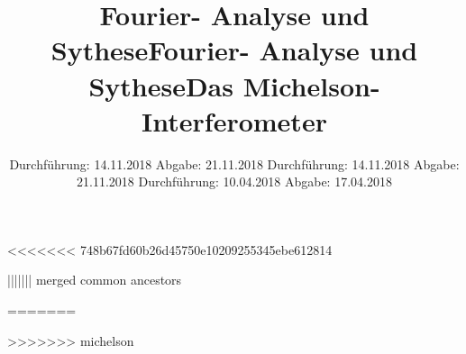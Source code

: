 <<<<<<< 748b67fd60b26d45750e10209255345ebe612814


\subject{Versuch 351}
\title{Fourier- Analyse und Sythese}
\date{%
  Durchführung: 14.11.2018
  \hspace{3em}
  Abgabe: 21.11.2018
}



\maketitle
\thispagestyle{empty}
\tableofcontents
\newpage






\printbibliography{}


||||||| merged common ancestors


\subject{Versuch 351}
\title{Fourier- Analyse und Sythese}
\date{%
  Durchführung: 14.11.2018
  \hspace{3em}
  Abgabe: 21.11.2018
}



\maketitle
\thispagestyle{empty}
\tableofcontents
\newpage






\printbibliography{}


=======


\subject{Versuch 401}
\title{Das Michelson-Interferometer}
\date{%
  Durchführung: 10.04.2018
  \hspace{3em}
  Abgabe: 17.04.2018
}



\maketitle
\thispagestyle{empty}
\tableofcontents
\newpage






\printbibliography{}


>>>>>>> michelson
